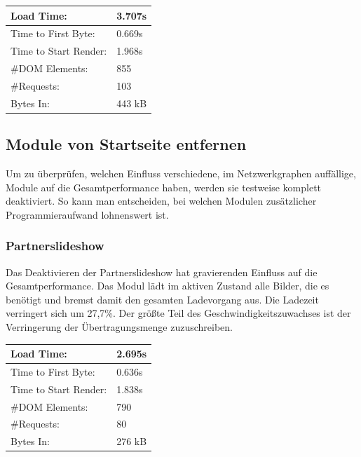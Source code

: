 \begin{table}
\caption{Ergebnis des Spritings der Theme Bilder}
    \begin{longtable}{ | p{3cm} | p{1.5cm} | }
    \hline
    Load Time: 			& 3.707s 	\\ \hline
    Time to First Byte:		& 0.669s  	\\ \hline
    Time to Start Render:	& 1.968s	\\ \hline
    \#DOM Elements:		& 855 		\\ \hline
    \#Requests:			& 103 		\\ \hline
    Bytes In:			& 443 kB 	\\ \hline
    \hline
    \end{longtable}
\end{table}

\subsection{Module von Startseite entfernen}
Um zu überprüfen, welchen Einfluss verschiedene, im Netzwerkgraphen auffällige, Module auf die Gesamtperformance haben, werden sie testweise komplett deaktiviert. So kann man entscheiden, bei welchen Modulen zusätzlicher Programmieraufwand lohnenswert ist.
\subsubsection{Partnerslideshow} Das Deaktivieren der Partnerslideshow hat gravierenden Einfluss auf die Gesamtperformance. Das Modul lädt im aktiven Zustand alle Bilder, die es benötigt und bremst damit den gesamten Ladevorgang aus. Die Ladezeit verringert sich um 27,7\%. Der größte Teil des Geschwindigkeitszuwachses ist der Verringerung der Übertragungsmenge zuzuschreiben. 

\begin{table}
\caption{Ergebnis der Deaktivierung der Partnerslideshow}
    \begin{longtable}{ | p{3cm} | p{1.5cm} | }
    \hline
    Load Time: 			& 2.695s 	\\ \hline
    Time to First Byte:		& 0.636s  	\\ \hline
    Time to Start Render:	& 1.838s	\\ \hline
    \#DOM Elements:		& 790 		\\ \hline
    \#Requests:			& 80 		\\ \hline
    Bytes In:			& 276 kB 	\\ \hline
    \hline
    \end{longtable}
\end{table}

